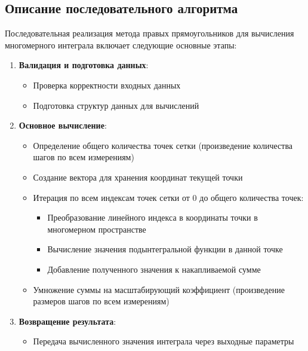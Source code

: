 \documentclass[a4paper,12pt]{article}
\begin{document}
  \subsection{Описание последовательного алгоритма}\label{subsec:seq_algorithm}

  Последовательная реализация метода правых прямоугольников для вычисления многомерного интеграла включает следующие основные этапы:

  \begin{enumerate}
    \item \textbf{Валидация и подготовка данных}:
    \begin{itemize}
      \item Проверка корректности входных данных
      \item Подготовка структур данных для вычислений
    \end{itemize}

    \item \textbf{Основное вычисление}:
    \begin{itemize}
      \item Определение общего количества точек сетки (произведение количества шагов по всем измерениям)
      \item Создание вектора для хранения координат текущей точки
      \item Итерация по всем индексам точек сетки от 0 до общего количества точек:
      \begin{itemize}
        \item Преобразование линейного индекса в координаты точки в многомерном пространстве
        \item Вычисление значения подынтегральной функции в данной точке
        \item Добавление полученного значения к накапливаемой сумме
      \end{itemize}
      \item Умножение суммы на масштабирующий коэффициент (произведение размеров шагов по всем измерениям)
    \end{itemize}

    \item \textbf{Возвращение результата}:
    \begin{itemize}
      \item Передача вычисленного значения интеграла через выходные параметры
    \end{itemize}
  \end{enumerate}
\end{document}
